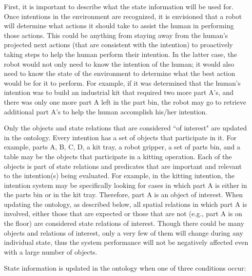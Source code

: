 \documentclass[preprint,12pt]{elsarticle}
\begin{document}
First, it is important to describe what the state information will be used for. Once intentions in the environment are recognized, it is envisioned that a robot will determine what actions it should take to assist the human in performing those actions. This could be anything from staying away from the human's projected next actions (that are consistent with the intention) to proactively taking steps to help the human perform their intention. In the latter case, the robot would not only need to know the intention of the human; it would also need to know the state of the environment to determine what the best action would be for it to perform. For example, if it was determined that the human's intention was to build an industrial kit that required two more part A's, and there was only one more part A left in the part bin, the robot may go to retrieve additional part A's to help the human accomplish his/her intention.

Only the objects and state relations that are considered ``of interest" are updated in the ontology. Every intention has a set of objects that participate in it. For example, parts A, B, C, D, a kit tray, a robot gripper, a set of parts bin, and a table may be the objects that participate in a kitting operation. Each of the objects is part of state relations and predicates that are important and relevant to the intention(s) being evaluated. For example, in the kitting intention, the intention system may be specifically looking for cases in which part A is either in the parts bin or in the kit tray. Therefore, part A is an object of interest. When updating the ontology, as described below, all spatial relations in which part A is involved, either those that are expected or those that are not (e.g., part A is on the floor) are considered state relations of interest. Though there could be many objects and relations of interest, only a very few of them will change during any individual state, thus the system performance will not be negatively affected even with a large number of objects.


State information is updated in the ontology when one of three conditions occur:
\end{document}
